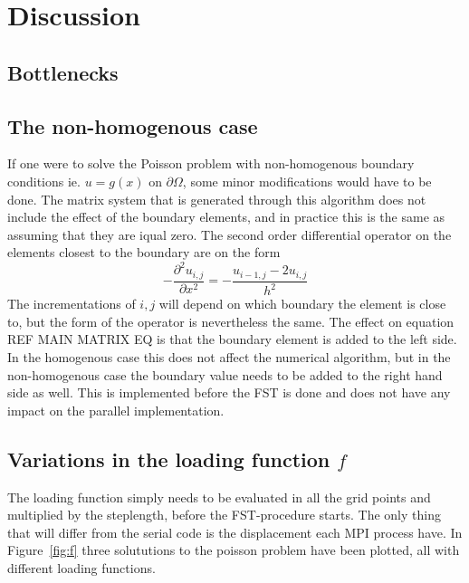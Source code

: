 \section{Discussion}

\subsection{Bottlenecks}

\subsection{The non-homogenous case}
If one were to solve the Poisson problem with non-homogenous boundary conditions ie. $u = g(x) $ on $\partial \Omega$, 
some minor modifications would have to be done. 
The matrix system that is generated through this algorithm does not include the effect of the boundary elements, 
and in practice this is the same as assuming that they are iqual zero. The second order differential operator on the elements 
closest to the boundary are on the form 
\begin{equation}
	-\frac{\partial^2 u_{i,j}}{\partial x^2} = -\frac{u_{i-1,j}-2u_{i,j}}{h^2}
\end{equation}
The incrementations of $i,j$ will depend on which boundary the element is close to, but the form of the operator is nevertheless the same.
The effect on equation REF MAIN MATRIX EQ is that the boundary element is added to the left side.
In the homogenous case this does not affect the numerical algorithm, but in the non-homogenous case the boundary value needs to be added to the 
right hand side as well. This is implemented before the FST is done and does not have any impact on the parallel implementation. 

\subsection{Variations in the loading function $f$}
The loading function simply needs to be evaluated in all the grid points and multiplied by the steplength, before the 
FST-procedure starts. The only thing that will differ from the serial code is the displacement each MPI process have.
In Figure~\ref{fig:f} three solututions to the poisson problem have been plotted, all with different loading functions. 

